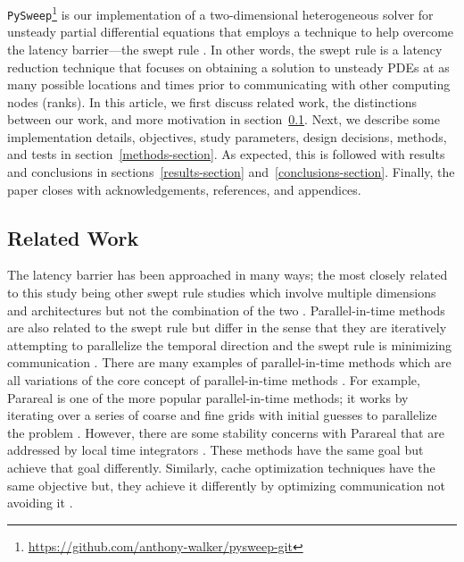 \documentclass[journal,article,submit,moreauthors,pdftex]{Definitions/mdpi}
\def\github{\url{https://github.com/anthony-walker/pysweep-git}}
\def\pysweep{\texttt{PySweep}}
\begin{document}
\par
\pysweep{}\footnote{\github} is our implementation of a two-dimensional heterogeneous solver for unsteady partial differential equations that employs a technique to help overcome the latency barrier---the swept rule \cite{Alhubail2016ThePDEs}. In other words, the swept rule is a latency reduction technique that focuses on obtaining a solution to unsteady PDEs at as many possible locations and times prior to communicating with other computing nodes (ranks). In this article, we first discuss related work, the distinctions between our work, and more motivation in section~\ref{related-section}. Next, we describe some implementation details, objectives, study parameters, design decisions, methods, and tests in section~\ref{methods-section}. As expected, this is followed with results and conclusions in sections~\ref{results-section} and~\ref{conclusions-section}. Finally, the paper closes with acknowledgements, references, and appendices.

\subsection{Related Work}
\label{related-section}
\par The latency barrier has been approached in many ways; the most closely related to this study being other swept rule studies which involve multiple dimensions and architectures but not the combination of the two \cite{Alhubail2016ThePDEs,Alhubail2018ThePDEs,Magee2018AcceleratingDecomposition,Magee2020ApplyingSystems}. Parallel-in-time methods are also related to the swept rule but differ in the sense that they are iteratively attempting to parallelize the temporal direction and the swept rule is minimizing communication \cite{Gander201550Integration}. There are many examples of parallel-in-time methods which are all variations of the core concept of parallel-in-time methods \cite{Falgout2014ParallelMultigrid,Lions2013Resolution,Maday2020AnAlgorithm,Wu2018Parareal,EmmettTowardEquations,MinionINTERWEAVINGMULTIGRID,Hahne2020PyMGRIT:MGRIT}. For example, Parareal is one of the more popular parallel-in-time methods; it works by iterating over a series of coarse and fine grids with initial guesses to parallelize the problem \cite{Lions2013Resolution}. However, there are some stability concerns with Parareal that are addressed by local time integrators \cite{Wu2018Parareal}. These methods have the same goal but achieve that goal differently. Similarly, cache optimization techniques have the same objective but, they achieve it differently by optimizing communication not avoiding it \cite{Kowarschik2003AnAlgorithms}.
\end{document}
